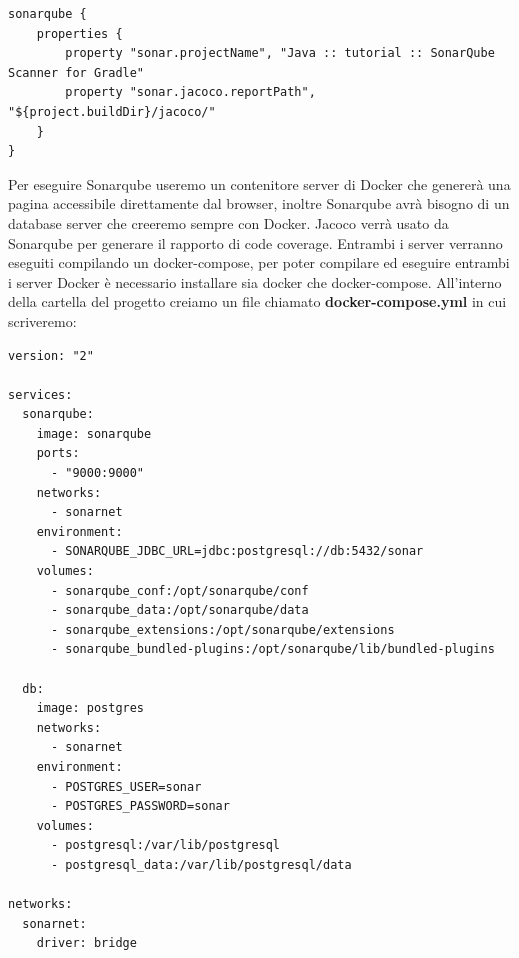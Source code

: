 \begin{enumerate}
\begin{lstlisting}[frame=single]
sonarqube {
    properties {
        property "sonar.projectName", "Java :: tutorial :: SonarQube Scanner for Gradle"
        property "sonar.jacoco.reportPath", "${project.buildDir}/jacoco/"
    }
}
    \end{lstlisting}
    Per eseguire Sonarqube useremo un contenitore server di Docker che genererà una pagina accessibile direttamente dal browser, inoltre Sonarqube avrà bisogno di un database server che creeremo sempre con Docker. Jacoco verrà usato da Sonarqube per generare il rapporto di code coverage. Entrambi i server verranno eseguiti compilando un docker-compose, per poter compilare ed eseguire entrambi i server Docker è necessario installare sia docker che docker-compose. All'interno della cartella del progetto creiamo un file chiamato \textbf{docker-compose.yml} in cui scriveremo:
    \begin{verbatim}
version: "2"

services:
  sonarqube:
    image: sonarqube
    ports:
      - "9000:9000"
    networks:
      - sonarnet
    environment:
      - SONARQUBE_JDBC_URL=jdbc:postgresql://db:5432/sonar
    volumes:
      - sonarqube_conf:/opt/sonarqube/conf
      - sonarqube_data:/opt/sonarqube/data
      - sonarqube_extensions:/opt/sonarqube/extensions
      - sonarqube_bundled-plugins:/opt/sonarqube/lib/bundled-plugins

  db:
    image: postgres
    networks:
      - sonarnet
    environment:
      - POSTGRES_USER=sonar
      - POSTGRES_PASSWORD=sonar
    volumes:
      - postgresql:/var/lib/postgresql
      - postgresql_data:/var/lib/postgresql/data

networks:
  sonarnet:
    driver: bridge


\end{verbatim}
\end{enumerate}
